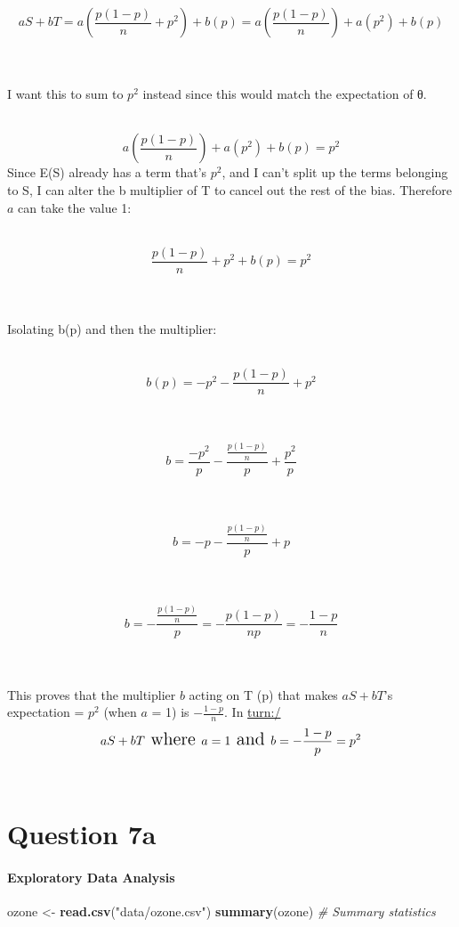 \documentclass[
]{article}
\newenvironment{Shaded}{\begin{snugshade}}{\end{snugshade}}
\newcommand{\CommentTok}[1]{\textcolor[rgb]{0.56,0.35,0.01}{\textit{#1}}}
\newcommand{\FunctionTok}[1]{\textcolor[rgb]{0.13,0.29,0.53}{\textbf{#1}}}
\newcommand{\NormalTok}[1]{#1}
\newcommand{\OtherTok}[1]{\textcolor[rgb]{0.56,0.35,0.01}{#1}}
\newcommand{\StringTok}[1]{\textcolor[rgb]{0.31,0.60,0.02}{#1}}
\begin{document}
\[
aS + bT = a(\frac{p(1-p)}{n} + p^2) + b(p) = a(\frac{p(1-p)}{n}) + a(p^2) + b(p)
\]\\
\strut \\
I want this to sum to \(p^2\) instead since this would match the
expectation of θ.\\
\strut \\
\[
 a(\frac{p(1-p)}{n}) + a(p^2) + b(p) = p^2
\] Since E(S) already has a term that's \(p^2\), and I can't split up
the terms belonging to S, I can alter the b multiplier of T to cancel
out the rest of the bias. Therefore \(a\) can take the value 1:\\
\strut \\
\[
\frac{p(1-p)}{n} + p^2 + b(p) = p^2
\]\\
\strut \\
Isolating b(p) and then the multiplier:\\
\strut \\
\[
b(p) = -p^2 - \frac{p(1-p)}{n} + p^2
\]\\
\strut \\
\[
b = \frac{-p^2}{p} - \frac{\frac{p(1-p)}{n} } p + \frac{p^2}{p}
\]\\
\strut \\
\[
b = -p - \frac{\frac{p(1-p)}{n} } p + p
\]\\
\strut \\
\[
b = - \frac{\frac{p(1-p)}{n} } p = -\frac{p(1-p)}{np} = -\frac{1-p}{n}
\]\\
\strut \\
This proves that the multiplier \(b\) acting on T (p) that makes
\(aS + bT\)'s expectation = \(p^2\) (when \(a\) = 1) is
\(-\frac{1-p}{n}\). In \url{turn:/}\\
\[
\Large
aS + bT  \text{ where } a = 1 \text{ and } b = -\frac{1-p}{p}= p^2  
\]\\

\hfill\break

\hfill\break
\hfill\break
\hfill\break

\section{Question 7a}\label{question-7a}

\paragraph{Exploratory Data Analysis}\label{exploratory-data-analysis}

\begin{Shaded}
\begin{Highlighting}[]
\NormalTok{ozone }\OtherTok{\textless{}{-}} \FunctionTok{read.csv}\NormalTok{(}\StringTok{"data/ozone.csv"}\NormalTok{)}
\FunctionTok{summary}\NormalTok{(ozone)  }\CommentTok{\# Summary statistics}
\end{Highlighting}
\end{Shaded}
\end{document}
